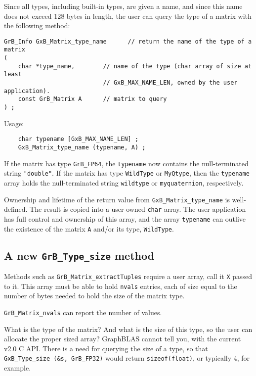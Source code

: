 \documentclass[12pt]{article}
\begin{document}
Since all types, including built-in types, are given a name, and since this
name does not exceed 128 bytes in length, the user can query the type of
a matrix with the following method:

{\footnotesize
\begin{verbatim}
GrB_Info GxB_Matrix_type_name      // return the name of the type of a matrix
(
    char *type_name,        // name of the type (char array of size at least
                            // GxB_MAX_NAME_LEN, owned by the user application).
    const GrB_Matrix A      // matrix to query
) ;
\end{verbatim}}

Usage:
{\footnotesize
\begin{verbatim}
    char typename [GxB_MAX_NAME_LEN] ;
    GxB_Matrix_type_name (typename, A) ;
\end{verbatim}}

If the matrix has type \verb'GrB_FP64', the \verb'typename' now contains the
null-terminated string \verb'"double"'.  If the matrix has type \verb'WildType'
or \verb'MyQtype', then the \verb'typename' array holds the null-terminated
string \verb'wildtype' or \verb'myquaternion', respectively.

Ownership and lifetime of the return value from \verb'GxB_Matrix_type_name'
is well-defined.  The result is copied into a user-owned \verb'char' array.
The user application has full control and ownership of this array, and the
array \verb'typename' can outlive the existence of the matrix \verb'A'
and/or its type, \verb'WildType'.

\subsection{A new {\tt GrB\_Type\_size} method}

Methods such as \verb'GrB_Matrix_extractTuples' require a user array,
call it \verb'X' passed to it.  This array must be able to hold
\verb'nvals' entries, each of size equal to the number of bytes needed
to hold the size of the matrix type.

\verb'GrB_Matrix_nvals' can report the number of values.

What is the type of the matrix?  And what is the size of this type, so
the user can allocate the proper sized array?  GraphBLAS cannot tell you,
with the current v2.0 C API.  There is a need for querying the size of
a type, so that \verb'GxB_Type_size (&s, GrB_FP32)' would return
\verb'sizeof(float)', or typically 4, for example.
\end{document}

